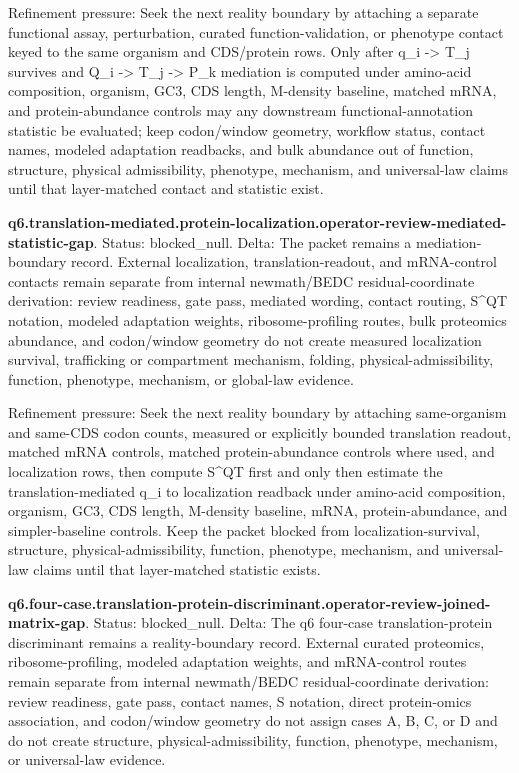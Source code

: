Refinement pressure: Seek the next reality boundary by attaching a separate functional assay, perturbation, curated function-validation, or phenotype contact keyed to the same organism and CDS/protein rows. Only after q\_i -> T\_j survives and Q\_i -> T\_j -> P\_k mediation is computed under amino-acid composition, organism, GC3, CDS length, M-density baseline, matched mRNA, and protein-abundance controls may any downstream functional-annotation statistic be evaluated; keep codon/window geometry, workflow status, contact names, modeled adaptation readbacks, and bulk abundance out of function, structure, physical admissibility, phenotype, mechanism, and universal-law claims until that layer-matched contact and statistic exist.

\textbf{q6.translation-mediated.protein-localization.operator-review-mediated-statistic-gap}. Status: blocked\_null. Delta: The packet remains a mediation-boundary record. External localization, translation-readout, and mRNA-control contacts remain separate from internal newmath/BEDC residual-coordinate derivation: review readiness, gate pass, mediated wording, contact routing, S\textasciicircum{}QT notation, modeled adaptation weights, ribosome-profiling routes, bulk proteomics abundance, and codon/window geometry do not create measured localization survival, trafficking or compartment mechanism, folding, physical-admissibility, function, phenotype, mechanism, or global-law evidence.

Refinement pressure: Seek the next reality boundary by attaching same-organism and same-CDS codon counts, measured or explicitly bounded translation readout, matched mRNA controls, matched protein-abundance controls where used, and localization rows, then compute S\textasciicircum{}QT first and only then estimate the translation-mediated q\_i to localization readback under amino-acid composition, organism, GC3, CDS length, M-density baseline, mRNA, protein-abundance, and simpler-baseline controls. Keep the packet blocked from localization-survival, structure, physical-admissibility, function, phenotype, mechanism, and universal-law claims until that layer-matched statistic exists.

\textbf{q6.four-case.translation-protein-discriminant.operator-review-joined-matrix-gap}. Status: blocked\_null. Delta: The q6 four-case translation-protein discriminant remains a reality-boundary record. External curated proteomics, ribosome-profiling, modeled adaptation weights, and mRNA-control routes remain separate from internal newmath/BEDC residual-coordinate derivation: review readiness, gate pass, contact names, S notation, direct protein-omics association, and codon/window geometry do not assign cases A, B, C, or D and do not create structure, physical-admissibility, function, phenotype, mechanism, or universal-law evidence.

